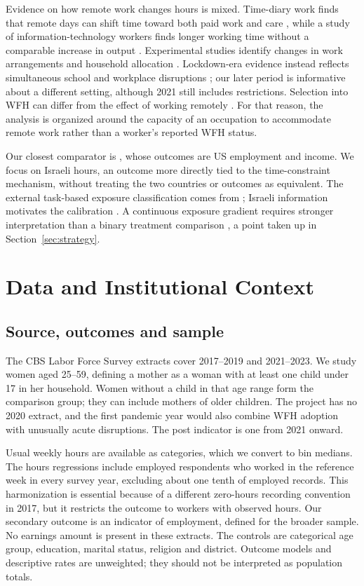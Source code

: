 \documentclass[12pt,a4paper]{article}
\begin{document}
Evidence on how remote work changes hours is mixed. Time-diary work finds that remote days can shift time toward both paid work and care \citep{pabilonia2022}, while a study of information-technology workers finds longer working time without a comparable increase in output \citep{gibbs2023}. Experimental studies identify changes in work arrangements and household allocation \citep{bloom2015,angelici2024}. Lockdown-era evidence instead reflects simultaneous school and workplace disruptions \citep{alon2020,adamsprassl2020,yaish2021}; our later period is informative about a different setting, although 2021 still includes restrictions. Selection into WFH can differ from the effect of working remotely \citep{emanuelharrington2024}. For that reason, the analysis is organized around the capacity of an occupation to accommodate remote work rather than a worker's reported WFH status.

Our closest comparator is \citet{harrington2025}, whose outcomes are US employment and income. We focus on Israeli hours, an outcome more directly tied to the time-constraint mechanism, without treating the two countries or outcomes as equivalent. The external task-based exposure classification comes from \citet{dingel2020}; Israeli information motivates the calibration \citep{madhala2020}. A continuous exposure gradient requires stronger interpretation than a binary treatment comparison \citep{callaway2024}, a point taken up in Section~\ref{sec:strategy}.

\section{Data and Institutional Context}\label{sec:data}
\subsection{Source, outcomes and sample}
The CBS Labor Force Survey extracts cover 2017--2019 and 2021--2023. We study women aged 25--59, defining a mother as a woman with at least one child under 17 in her household. Women without a child in that age range form the comparison group; they can include mothers of older children. The project has no 2020 extract, and the first pandemic year would also combine WFH adoption with unusually acute disruptions. The post indicator is one from 2021 onward.

Usual weekly hours are available as categories, which we convert to bin medians. The hours regressions include employed respondents who worked in the reference week in every survey year, excluding about one tenth of employed records. This harmonization is essential because of a different zero-hours recording convention in 2017, but it restricts the outcome to workers with observed hours. Our secondary outcome is an indicator of employment, defined for the broader sample. No earnings amount is present in these extracts. The controls are categorical age group, education, marital status, religion and district. Outcome models and descriptive rates are unweighted; they should not be interpreted as population totals.
\end{document}
